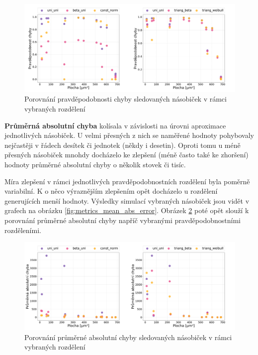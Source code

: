 \begin{figure}[H]
    \centering
    \includegraphics[width=\textwidth]{obrazky-figures/scatter_error_prob.png}
    \caption{Porovnání pravděpodobnosti chyby sledovaných násobiček v rámci vybraných rozdělení}
    \label{fig:scatter_error_prob}
\end{figure}

\textbf{Průměrná absolutní chyba} kolísala v závislosti na úrovni aproximace jednotlivých násobiček. U velmi přesných z nich se naměřené hodnoty pohybovaly nejčastěji v řádech desítek či jednotek (někdy i desetin). Oproti tomu u méně přesných násobiček mnohdy docházelo ke zlepšení (méně často také ke zhoršení) hodnoty průměrné absolutní chyby o několik stovek či tisíc.

Míra zlepšení v rámci jednotlivých pravděpodobnostních rozdělení byla poměrně variabilní. K o něco výraznějším zlepšením opět docházelo u rozdělení generujících menší hodnoty. Výsledky simulací vybraných násobiček jsou vidět v grafech na obrázku \ref{fig:metrics_mean_abs_error}. Obrázek \ref{fig:scatter_mean_abs_error} poté opět slouží k porovnání průměrné absolutní chyby napříč vybranými pravděpodobnostními rozděleními.

\begin{figure}[H]
    \centering
    \includegraphics[width=\textwidth]{obrazky-figures/scatter_mean_abs_error.png}
    \caption{Porovnání průměrné absolutní chyby sledovaných násobiček v rámci vybraných rozdělení}
    \label{fig:scatter_mean_abs_error}
\end{figure}

